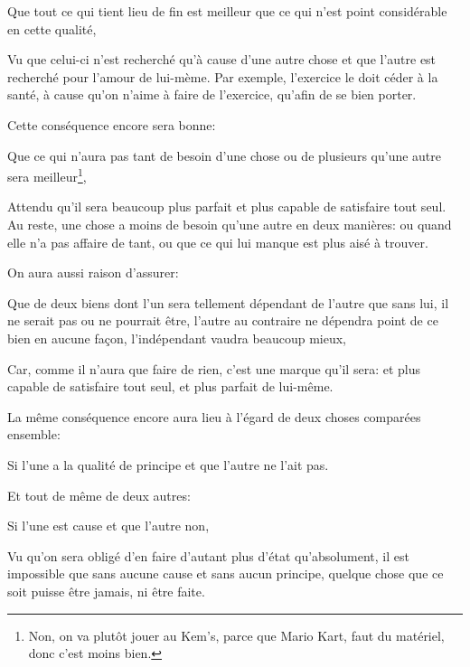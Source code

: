 \begin{lieu}
	Que tout ce qui tient lieu de fin est meilleur que ce qui n'est point considérable en cette qualité,
\end{lieu}

Vu que celui-ci n'est recherché qu'à cause d'une autre chose et que l'autre est recherché pour l'amour de lui-mème. Par
exemple, l'exercice le doit céder à la santé, à cause qu'on n'aime à faire de l'exercice, qu'afin de se bien porter.

\bigbreak

Cette conséquence encore sera bonne:

\begin{lieu}
	Que ce qui n'aura pas tant de besoin d'une chose ou de plusieurs qu'une autre sera meilleur\footnote{Non, on va plutôt
	jouer au Kem's, parce que Mario Kart, faut du matériel, donc c'est moins bien.},
\end{lieu}

Attendu qu'il sera beaucoup plus parfait et plus capable de satisfaire tout seul. Au reste, une chose a moins de besoin
qu'une autre en deux manières: ou quand elle n'a pas affaire de tant, ou que ce qui lui manque est plus aisé à trouver.

\bigbreak

On aura aussi raison d'assurer:

\begin{lieu}
	Que de deux biens dont l'un sera tellement dépendant de l'autre que sans lui, il ne serait pas ou ne pourrait être,
	l'autre au contraire ne dépendra point de ce bien en aucune façon, l'indépendant vaudra beaucoup mieux,
\end{lieu}

Car, comme il n'aura que faire de rien, c'est une marque qu'il sera: et plus capable de satisfaire tout seul, et plus
parfait de lui-même.

La même conséquence encore aura lieu à l'égard de deux choses comparées ensemble:

\begin{lieu}
	Si l'une a la qualité de principe et que l'autre ne l'ait pas.
\end{lieu}

Et tout de même de deux autres:

\begin{lieu}
	Si l'une est cause et que l'autre non,
\end{lieu}

Vu qu'on sera obligé d'en faire d'autant plus d'état qu'absolument, il est impossible que sans aucune cause et sans aucun
principe, quelque chose que ce soit puisse être jamais, ni être faite.


